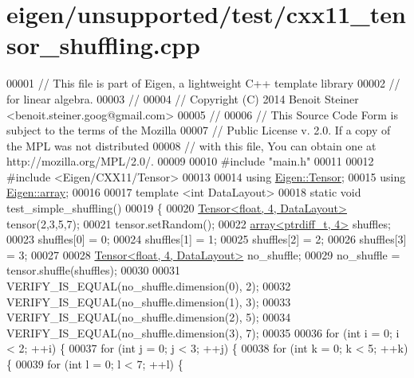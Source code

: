 \hypertarget{eigen_2unsupported_2test_2cxx11__tensor__shuffling_8cpp_source}{}\section{eigen/unsupported/test/cxx11\+\_\+tensor\+\_\+shuffling.cpp}
\label{eigen_2unsupported_2test_2cxx11__tensor__shuffling_8cpp_source}

\begin{DoxyCode}
00001 \textcolor{comment}{// This file is part of Eigen, a lightweight C++ template library}
00002 \textcolor{comment}{// for linear algebra.}
00003 \textcolor{comment}{//}
00004 \textcolor{comment}{// Copyright (C) 2014 Benoit Steiner <benoit.steiner.goog@gmail.com>}
00005 \textcolor{comment}{//}
00006 \textcolor{comment}{// This Source Code Form is subject to the terms of the Mozilla}
00007 \textcolor{comment}{// Public License v. 2.0. If a copy of the MPL was not distributed}
00008 \textcolor{comment}{// with this file, You can obtain one at http://mozilla.org/MPL/2.0/.}
00009 
00010 \textcolor{preprocessor}{#include "main.h"}
00011 
00012 \textcolor{preprocessor}{#include <Eigen/CXX11/Tensor>}
00013 
00014 \textcolor{keyword}{using} \hyperlink{class_eigen_1_1_tensor}{Eigen::Tensor};
00015 \textcolor{keyword}{using} \hyperlink{class_eigen_1_1array}{Eigen::array};
00016 
00017 \textcolor{keyword}{template} <\textcolor{keywordtype}{int} DataLayout>
00018 \textcolor{keyword}{static} \textcolor{keywordtype}{void} test\_simple\_shuffling()
00019 \{
00020   \hyperlink{class_eigen_1_1_tensor}{Tensor<float, 4, DataLayout>} tensor(2,3,5,7);
00021   tensor.setRandom();
00022   \hyperlink{class_eigen_1_1array}{array<ptrdiff\_t, 4>} shuffles;
00023   shuffles[0] = 0;
00024   shuffles[1] = 1;
00025   shuffles[2] = 2;
00026   shuffles[3] = 3;
00027 
00028   \hyperlink{class_eigen_1_1_tensor}{Tensor<float, 4, DataLayout>} no\_shuffle;
00029   no\_shuffle = tensor.shuffle(shuffles);
00030 
00031   VERIFY\_IS\_EQUAL(no\_shuffle.dimension(0), 2);
00032   VERIFY\_IS\_EQUAL(no\_shuffle.dimension(1), 3);
00033   VERIFY\_IS\_EQUAL(no\_shuffle.dimension(2), 5);
00034   VERIFY\_IS\_EQUAL(no\_shuffle.dimension(3), 7);
00035 
00036   \textcolor{keywordflow}{for} (\textcolor{keywordtype}{int} i = 0; i < 2; ++i) \{
00037     \textcolor{keywordflow}{for} (\textcolor{keywordtype}{int} j = 0; j < 3; ++j) \{
00038       \textcolor{keywordflow}{for} (\textcolor{keywordtype}{int} k = 0; k < 5; ++k) \{
00039         \textcolor{keywordflow}{for} (\textcolor{keywordtype}{int} l = 0; l < 7; ++l) \{

\end{DoxyCode}
